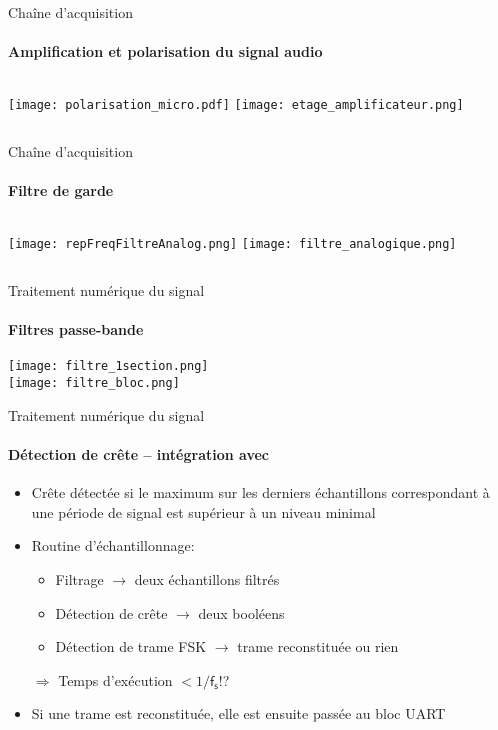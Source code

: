 \begin{frame}
  \tableofcontents[currentsection]
\end{frame}

\begin{frame}{Chaîne d'acquisition}
  \framesubtitle{Amplification et polarisation du signal audio}
  \begin{columns}[c]
  \vspace{4.5cm}
  \texttt{[image: polarisation\_micro.pdf]}
  \texttt{[image: etage\_amplificateur.png]}
  \end{columns}
\end{frame}

\begin{frame}{Chaîne d'acquisition}
  \framesubtitle{Filtre de garde}
  \begin{columns}[c]
  \texttt{[image: repFreqFiltreAnalog.png]}
  \texttt{[image: filtre\_analogique.png]}
  \end{columns}
\end{frame}

\begin{frame}{Traitement numérique du signal}
  \framesubtitle{Filtres passe-bande}
  \begin{center}
  \texttt{[image: filtre\_1section.png]}\\
  \texttt{[image: filtre\_bloc.png]}
  \end{center}
\end{frame}

\begin{frame}{Traitement numérique du signal}
  \framesubtitle{Détection de crête -- intégration avec }
  \begin{itemize}
    \item Crête détectée si le maximum sur les derniers échantillons correspondant à une période de signal est supérieur à un niveau minimal
    \item Routine d'échantillonnage:
    \begin{itemize}
      \item Filtrage $\rightarrow$ deux échantillons filtrés
      \item Détection de crête $\rightarrow$ deux booléens
      \item Détection de trame FSK $\rightarrow$ trame reconstituée ou rien
    \end{itemize}
    {\large $\Rightarrow$ Temps d'exécution $<1/\mathsf{f_s}$!?}
    \item Si une trame est reconstituée, elle est ensuite passée au bloc UART
  \end{itemize}
\end{frame}



